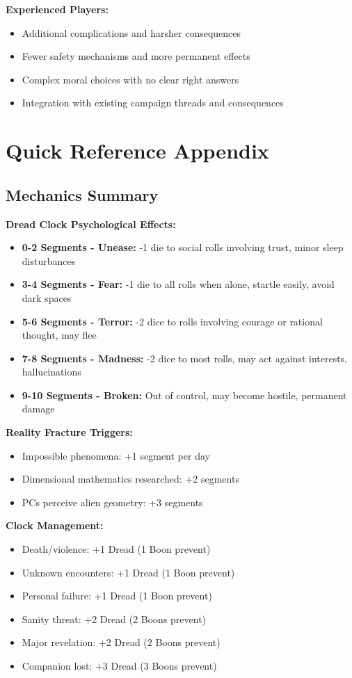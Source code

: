 \documentclass[11pt]{article}
\begin{document}
\textbf{Experienced Players:}
\begin{itemize}
\item Additional complications and harsher consequences
\item Fewer safety mechanisms and more permanent effects
\item Complex moral choices with no clear right answers
\item Integration with existing campaign threads and consequences
\end{itemize}

\section{Quick Reference Appendix}

\subsection{Mechanics Summary}

\textbf{Dread Clock Psychological Effects:}
\begin{itemize}
\item \textbf{0-2 Segments - Unease:} -1 die to social rolls involving trust, minor sleep disturbances
\item \textbf{3-4 Segments - Fear:} -1 die to all rolls when alone, startle easily, avoid dark spaces
\item \textbf{5-6 Segments - Terror:} -2 dice to rolls involving courage or rational thought, may flee
\item \textbf{7-8 Segments - Madness:} -2 dice to most rolls, may act against interests, hallucinations
\item \textbf{9-10 Segments - Broken:} Out of control, may become hostile, permanent damage
\end{itemize}

\textbf{Reality Fracture Triggers:}
\begin{itemize}
\item Impossible phenomena: +1 segment per day
\item Dimensional mathematics researched: +2 segments
\item PCs perceive alien geometry: +3 segments
\end{itemize}

\textbf{Clock Management:}
\begin{itemize}
\item Death/violence: +1 Dread (1 Boon prevent)
\item Unknown encounters: +1 Dread (1 Boon prevent)
\item Personal failure: +1 Dread (1 Boon prevent)
\item Sanity threat: +2 Dread (2 Boons prevent)
\item Major revelation: +2 Dread (2 Boons prevent)
\item Companion lost: +3 Dread (3 Boons prevent)
\end{itemize}
\end{document}
